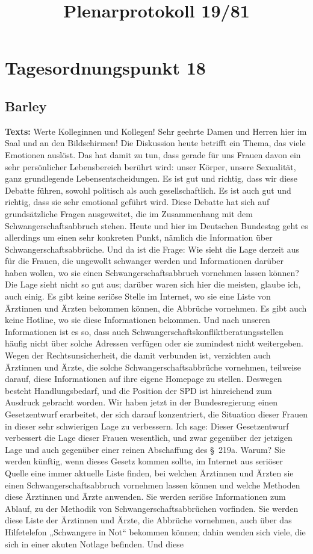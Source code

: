 \documentclass{article}
\begin{document}
\title{Plenarprotokoll 19/81}
\date{}
\maketitle
\tableofcontents
\newpage
\section{Tagesordnungspunkt 18}
\subsection{Barley}
\noindent\textbf{Texts:} Werte Kolleginnen und Kollegen! Sehr geehrte Damen und Herren hier im Saal und an den Bildschirmen! Die Diskussion heute betrifft ein Thema, das viele Emotionen auslöst. Das hat damit zu tun, dass gerade für uns Frauen davon ein sehr persönlicher Lebensbereich berührt wird: unser Körper, unsere Sexualität, ganz grundlegende Lebensentscheidungen. Es ist gut und richtig, dass wir diese Debatte führen, sowohl politisch als auch gesellschaftlich. Es ist auch gut und richtig, dass sie sehr emotional geführt wird. Diese Debatte hat sich auf grundsätzliche Fragen ausgeweitet, die im Zusammenhang mit dem Schwangerschaftsabbruch stehen. Heute und hier im Deutschen Bundestag geht es allerdings um einen sehr konkreten Punkt, nämlich die Information über Schwangerschaftsabbrüche. Und da ist die Frage: Wie sieht die Lage derzeit aus für die Frauen, die ungewollt schwanger werden und Informationen darüber haben wollen, wo sie einen Schwangerschaftsabbruch vornehmen lassen können? Die Lage sieht nicht so gut aus; darüber waren sich hier die meisten, glaube ich, auch einig. Es gibt keine seriöse Stelle im Internet, wo sie eine Liste von Ärztinnen und Ärzten bekommen können, die Abbrüche vornehmen. Es gibt auch keine Hotline, wo sie diese Informationen bekommen. Und nach unseren Informationen ist es so, dass auch Schwangerschaftskonfliktberatungsstellen häufig nicht über solche Adressen verfügen oder sie zumindest nicht weitergeben. Wegen der Rechtsunsicherheit, die damit verbunden ist, verzichten auch Ärztinnen und Ärzte, die solche Schwangerschaftsabbrüche vornehmen, teilweise darauf, diese Informationen auf ihre eigene Homepage zu stellen. Deswegen besteht Handlungsbedarf, und die Position der SPD ist hinreichend zum Ausdruck gebracht worden. Wir haben jetzt in der Bundesregierung einen Gesetzentwurf erarbeitet, der sich darauf konzentriert, die Situation dieser Frauen in dieser sehr schwierigen Lage zu verbessern. Ich sage: Dieser Gesetzentwurf verbessert die Lage dieser Frauen wesentlich, und zwar gegenüber der jetzigen Lage  und auch gegenüber einer reinen Abschaffung des § 219a. Warum? Sie werden künftig, wenn dieses Gesetz kommen sollte, im Internet aus seriöser Quelle eine immer aktuelle Liste finden, bei welchen Ärztinnen und Ärzten sie einen Schwangerschaftsabbruch vornehmen lassen können und welche Methoden diese Ärztinnen und Ärzte anwenden. Sie werden seriöse Informationen zum Ablauf, zu der Methodik von Schwangerschaftsabbrüchen vorfinden. Sie werden diese Liste der Ärztinnen und Ärzte, die Abbrüche vornehmen, auch über das Hilfetelefon „Schwangere in Not“ bekommen können; dahin wenden sich viele, die sich in einer akuten Notlage befinden. Und diese 
\end{document}
